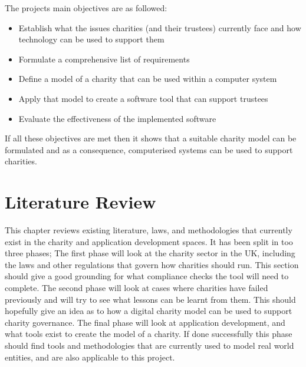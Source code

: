\documentclass{UoYCSproject}
\begin{document}
The projects main objectives are as followed:
\begin{itemize}[noitemsep]
    \item Establish what the issues charities (and their trustees) currently face and how technology can be used to support them
    \item Formulate a comprehensive list of requirements
    \item Define a model of a charity that can be used within a computer system
    \item Apply that model to create a software tool that can support trustees
    \item Evaluate the effectiveness of the implemented software 
\end{itemize}

If all these objectives are met then it shows that a suitable charity model can be formulated and as a consequence, computerised systems can be used to support charities.


\chapter{Literature Review}
\label{cha:litreview}

This chapter reviews existing literature, laws, and methodologies that currently exist in the charity and application development spaces. It has been split in too three phases; The first phase will look at the charity sector in the UK, including the laws and other regulations that govern how charities should run. This section should give a good grounding for what compliance checks the tool will need to complete. The second phase will look at cases where charities have failed previously and will try to see what lessons can be learnt from them. This should hopefully give an idea as to how a digital charity model can be used to support charity governance. The final phase will look at application development, and what tools exist to create the model of a charity. If done successfully this phase should find tools and methodologies that are currently used to model real world entities, and are also applicable to this project.
\end{document}
